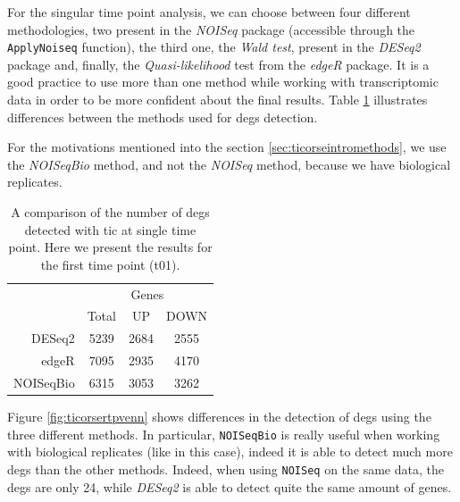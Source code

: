 For the singular time point analysis, we can choose between four different methodologies, two present in the \textit{NOISeq} package (accessible through the \lstinline!ApplyNoiseq! function), the third one, the \textit{Wald test}, present in the \textit{DESeq2} package and, finally, the \textit{Quasi-likelihood} test from the \textit{edgeR} package.
It is a good practice to use more than one method while working with transcriptomic data in order to be more confident about the final results.
Table \ref{tab:ticorserderesultstp} illustrates differences between the methods used for \glspl{deg} detection.

For the motivations mentioned into the section \ref{sec:ticorseintromethods}, we use the \textit{NOISeqBio} method, and not the \textit{NOISeq} method, because we have biological replicates.


\begin{table}[H]
\centering
\begin{tabular}{r c c c}
\multicolumn{1}{r}{} & \multicolumn{3}{c}{Genes} \\
\cline{2-4}
\multicolumn{1}{r}{} & Total & UP & DOWN \\
\cline{2-4}
DESeq2 & 5239 & 2684 & 2555 \\
edgeR & 7095 & 2935 & 4170 \\
NOISeqBio & 6315 & 3053 & 3262 \\
\end{tabular}
\caption[\gls{tic} Single Time Points DE methods results]{A comparison of the number of \glspl{deg} detected with \gls{tic} at single time point. Here we present the results for the first time point (t01).}
\label{tab:ticorserderesultstp}
\end{table}

Figure \ref{fig:ticorsertpvenn} shows differences in the detection of \glspl{deg} using the three different methods.
In particular, \lstinline!NOISeqBio! is really useful when working with biological replicates (like in this case), indeed it is able to detect much more \glspl{deg} than the other methods. 
Indeed, when using \lstinline!NOISeq! on the same data, the \glspl{deg} are only 24, while \textit{DESeq2} is able to detect quite the same amount of genes.

